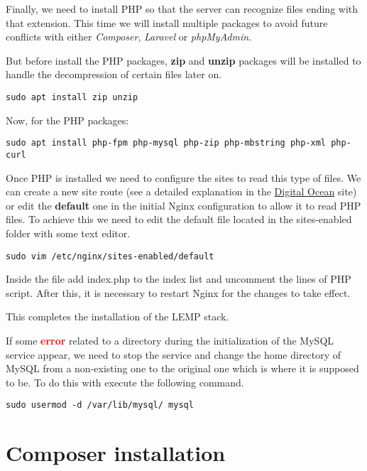 \documentclass[twocolumn]{article}
\begin{document}
Finally, we need to install PHP so that the server can recognize files ending with that extension. This time we will install multiple packages to avoid future conflicts with either \textit{Composer}, \textit{Laravel} or \mbox{\textit{phpMyAdmin}}.

But before install the PHP packages, \textbf{zip} and \mbox{\textbf{unzip}} packages will be installed to handle the decompression of certain files later on.

\begin{lstlisting}
sudo apt install zip unzip
\end{lstlisting}

Now, for the PHP packages:

\begin{lstlisting}
sudo apt install php-fpm php-mysql php-zip php-mbstring php-xml php-curl
\end{lstlisting}

Once PHP is installed we need to configure the sites to read this type of files. We can create a new site route (see a detailed explanation in the \href{https://www.digitalocean.com/community/tutorials/how-to-install-linux-nginx-mysql-php-lemp-stack-on-ubuntu-20-04}{Digital Ocean} site) or edit the \textbf{default} one in the initial \mbox{Nginx} configuration to allow it to read PHP files. To achieve this we need to edit the default file located in the sites-enabled folder with some text editor.

\begin{lstlisting}
sudo vim /etc/nginx/sites-enabled/default
\end{lstlisting}

Inside the file add index.php to the index list and uncomment the lines of PHP script. After this, it is necessary to restart Nginx for the changes to take effect.

This completes the installation of the LEMP stack.

If some \textbf{\textcolor{red}{error}} related to a directory during the initialization of the MySQL service appear, we need to stop the service and change the home directory of MySQL from a non-existing one to the original one which is where it is supposed to be. To do this with execute the following command.

\begin{lstlisting}
sudo usermod -d /var/lib/mysql/ mysql
\end{lstlisting}

\section{Composer installation}
\end{document}
